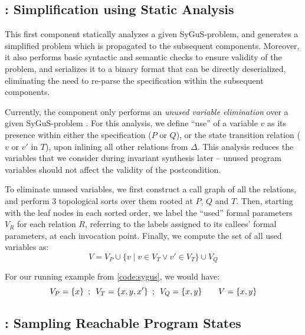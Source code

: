\documentclass[conference]{IEEEtran}
\begin{document}
\subsection{\Process: Simplification using Static Analysis} \label{subsec:Process}

\noindent
This first component statically analyzes a given SyGuS-\INV problem,
and generates a simplified problem which is propagated to the subsequent components.
Moreover, it also performs basic syntactic and semantic checks to ensure validity of the problem,
and serializes it to a binary format that can be directly deserialized,
eliminating the need to re-parse the specification within the subsequent components.

Currently, the \Process component only performs an
\emph{unused variable elimination} over a given SyGuS-\INV problem \SyGuSINVQuadruplet.
For this analysis, we define ``use'' of a variable $v$ as its presence within either the specification ($P$ or $Q$),
or the state transition relation ($v$ or $v'$ in $T$), upon inlining all other relations from $\Delta$.
This analysis reduces the variables that we consider during invariant synthesis later --
unused program variables should not affect the validity of the postcondition.

To eliminate unused variables, we first construct a call graph of all the relations,
and perform 3 topological sorts over them rooted at $P$, $Q$ and $T$.
Then, starting with the leaf nodes in each sorted order, we label the ``used'' formal parameters $V_R$ for each relation $R$,
referring to the labels assigned to its callees' formal parameters, at each invocation point.
Finally, we compute the set of all used variables as:
$$
    V = V_P \cup \{ v \mid v \in V_T \vee v' \in V_T \} \cup V_Q
$$

For our running example from \cref{code:sygus}, we would have:
$$
    V_P = \{ x \} \enskip;\enskip V_T = \{ x, y, x' \} \enskip;\enskip V_Q = \{ x, y \} \qquad V = \{ x, y \}
$$

\subsection{\Record: Sampling Reachable Program States} \label{subsec:Record}
\end{document}
